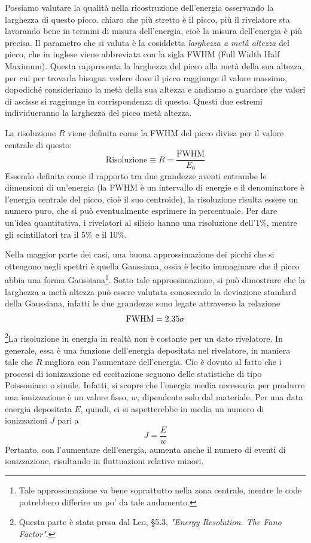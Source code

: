 Possiamo valutare la qualità nella ricostruzione dell'energia osservando la larghezza di questo picco. \E chiaro che più stretto è il picco, più il rivelatore sta lavorando bene in termini di misura dell'energia, cioè la misura dell'energia è più precisa. Il parametro che si valuta è la cosiddetta \textit{larghezza a metà altezza} del picco, che in inglese viene abbreviata con la sigla FWHM (Full Width Half Maximum). Questa rappresenta la larghezza del picco alla metà della sua altezza, per cui per trovarla bisogna vedere dove il picco raggiunge il valore massimo, dopodiché consideriamo la metà della sua altezza e andiamo a guardare che valori di ascisse si raggiunge in corrispondenza di questo. Questi due estremi individueranno la larghezza del picco metà altezza.

La risoluzione $R$ viene definita come la FWHM del picco divisa per il valore centrale di questo:
\begin{equation*}
   \text{Risoluzione}\equiv R=\frac{\text{FWHM}}{E_0}
\end{equation*}
Essendo definita come il rapporto tra due grandezze aventi entrambe le dimensioni di un'energia (la FWHM è un intervallo di energie e il denominatore è l'energia centrale del picco, cioè il suo centroide), la risoluzione risulta essere un numero puro, che si può eventualmente esprimere in percentuale. Per dare un'idea quantitativa, i rivelatori al silicio hanno una risoluzione dell'1\%, mentre gli scintillatori tra il 5\% e il 10\%.

Nella maggior parte dei casi, una buona approssimazione dei picchi che si ottengono negli spettri è quella Gaussiana, ossia è lecito immaginare che il picco abbia una forma Gaussiana\footnote{Tale approssimazione va bene soprattutto nella zona centrale, mentre le code potrebbero differire un po' da tale andamento.}. Sotto tale approssimazione, si può dimostrare che la larghezza a metà altezza può essere valutata conoscendo la deviazione standard della Gaussiana, infatti le due grandezze sono legate attraverso la relazione
\begin{equation*}
   \rm FWHM=2.35\sigma
\end{equation*}
\footnote{Questa parte è stata presa dal Leo, \S5.3, \textit{"Energy Resolution. The Fano Factor"}.}La risoluzione in energia in realtà non è costante per un dato rivelatore. In generale, essa è una funzione dell'energia depositata nel rivelatore, in maniera tale che $R$ migliora con l'aumentare dell'energia. Cio è dovuto al fatto che i processi di ionizzazione ed eccitazione seguono delle statistiche di tipo Poissoniano o simile. Infatti, si scopre che l'energia media necessaria per produrre una ionizzazione è un valore fisso, $w$, dipendente solo dal materiale. Per una data energia depositata $E$, quindi, ci si aspetterebbe in media un numero di ionizzazioni $J$ pari a
\begin{equation*}
   J=\frac{E}{w} 
\end{equation*}
Pertanto, con l'aumentare dell'energia, aumenta anche il numero di eventi di ionizzazione, risultando in fluttuazioni relative minori.

